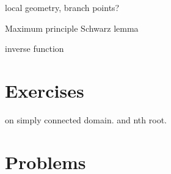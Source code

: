 \documentclass{../note}
\begin{document}
\begin{prb}
\end{prb}


local geometry, branch points?

\begin{prb}
\end{prb}
Maximum principle
Schwarz lemma

\begin{prb}
\end{prb}
inverse function



\section*{Exercises}
\begin{prb}
\end{prb}
\begin{prb}
on simply connected domain.
and nth root.
\end{prb}
\begin{prb}
\end{prb}


\section*{Problems}
\end{document}
